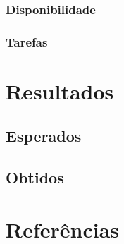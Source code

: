 \documentclass[a4paper]{article}
\begin{document}
\subsubsection{Disponibilidade}
\subsubsection{Tarefas}

\pagebreak

\section{Resultados}

\subsection{Esperados}
\subsection{Obtidos}

\pagebreak

\section{Referências}
\end{document}
